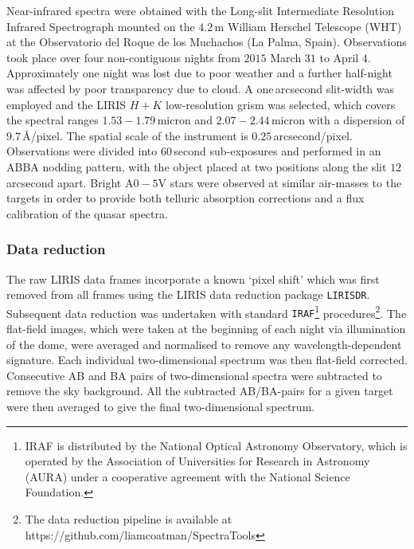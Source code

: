 Near-infrared spectra were obtained with the Long-slit Intermediate Resolution Infrared Spectrograph \citep[LIRIS;][]{manchado98} mounted on the $4.2$\,m William Herschel Telescope (WHT) at the Observatorio del Roque de los Muchachos (La Palma, Spain). 
Observations took place over four non-contiguous nights from $2015$ March $31$ to April $4$. 
Approximately one night was lost due to poor weather and a further half-night was affected by poor transparency due to cloud. 
A one\,arcsecond slit-width was employed and the LIRIS $H+K$ low-resolution grism was selected, which covers the spectral ranges $1.53-1.79$\,micron and $2.07-2.44$\,micron with a dispersion of $9.7$\,\AA/pixel. 
The spatial scale of the instrument is $0.25$\,arcsecond/pixel. 
Observations were divided into $60$\,second sub-exposures and performed in an ABBA nodding pattern, with the object placed at two positions along the slit $12$\,arcsecond apart. 
Bright A$0-5$V stars were observed at similar air-masses to the targets in order to provide both telluric absorption corrections and a flux calibration of the quasar spectra.

\subsubsection{Data reduction}

The raw LIRIS data frames incorporate a known `pixel shift' which was first removed from all frames using the LIRIS data reduction package {\tt LIRISDR}. 
Subsequent data reduction was undertaken with standard {\tt IRAF}\footnote{IRAF is distributed by the National Optical Astronomy Observatory, which is operated by the Association of Universities for Research in Astronomy (AURA) under a cooperative agreement with the National Science Foundation.} procedures\footnote{The data reduction pipeline is available at https://github.com/liamcoatman/SpectraTools}.  
The flat-field images, which were taken at the beginning of each night via illumination of the dome, were averaged and normalised to remove any wavelength-dependent signature. 
Each individual two-dimensional spectrum was then flat-field corrected. 
Consecutive AB and BA pairs of two-dimensional spectra were subtracted to remove the sky background. 
All the subtracted AB/BA-pairs for a given target were then averaged to give the final two-dimensional spectrum.

